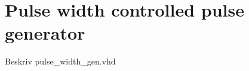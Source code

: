 \chapter{Pulse width controlled pulse generator} \label{App:PWCPulseGen}

Beskriv pulse_width_gen.vhd
